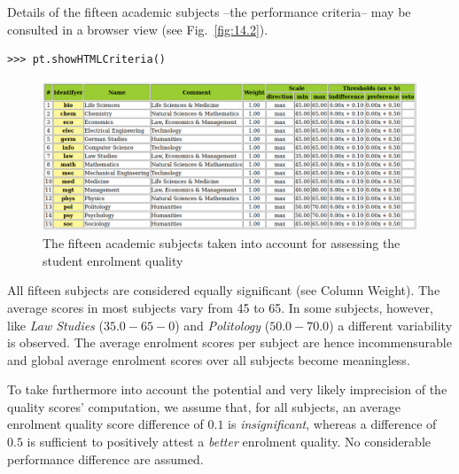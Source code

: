 Details of the fifteen academic subjects --the performance criteria-- may be consulted in a browser view (see Fig.~\vref{fig:14.2}).
\begin{lstlisting}
>>> pt.showHTMLCriteria()
\end{lstlisting}
\begin{figure}[ht]
\includegraphics[width=\hsize]{Figures/14-2-spiegelCriteria.png}
\caption[Fifteen popular academic subjects]{The fifteen academic subjects taken into account for assessing the student enrolment quality}
\label{fig:14.2}       %
\end{figure}

All fifteen subjects are considered equally significant (see Column Weight). The average scores in most subjects vary from 45 to 65. In some subjects, however, like \emph{Law Studies} ($35.0 - 65-0$) and \emph{Politology} ($50.0 - 70.0$) a different variability is observed. The average enrolment scores per subject are hence incommensurable and global average enrolment scores over all subjects become meaningless. 

To take furthermore into account the potential and very likely imprecision of the quality scores' computation, we assume that, for all subjects, an average enrolment quality score difference of $0.1$ is \emph{insignificant}, whereas a difference of $0.5$ is sufficient to positively attest a \emph{better} enrolment quality. No considerable performance difference are assumed.

